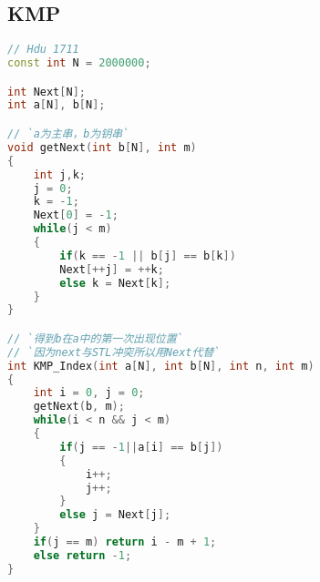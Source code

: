 ﻿\subsection{KMP}
\begin{lstlisting}[language=C++]
// Hdu 1711
const int N = 2000000;

int Next[N];
int a[N], b[N];

// `a为主串，b为钥串`
void getNext(int b[N], int m)
{
	int j,k;
    j = 0;
    k = -1;
    Next[0] = -1;
	while(j < m)
    {
		if(k == -1 || b[j] == b[k])
        Next[++j] = ++k;
		else k = Next[k];
    }
}

// `得到b在a中的第一次出现位置`
// `因为next与STL冲突所以用Next代替`
int KMP_Index(int a[N], int b[N], int n, int m)
{
	int i = 0, j = 0;
    getNext(b, m);
    while(i < n && j < m)
    {
		if(j == -1||a[i] == b[j])
        {
            i++;
            j++;
        }
        else j = Next[j];
    }
    if(j == m) return i - m + 1;
	else return -1;
}
	
	\end{lstlisting}